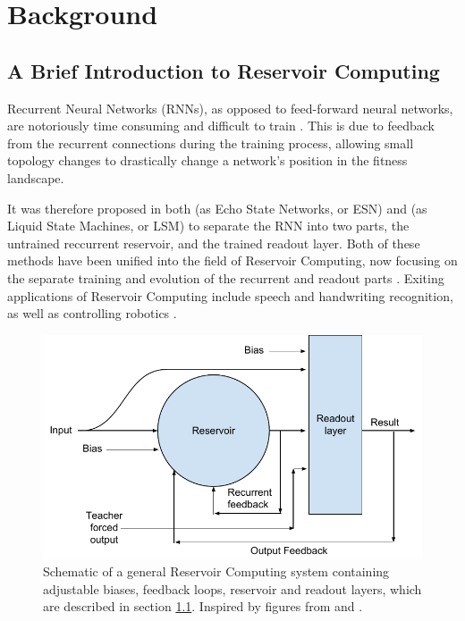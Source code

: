 \chapter{Background}
\label{chapter:background}

\section{A Brief Introduction to Reservoir Computing}
\label{section:reservoir-computing-introduction}

Recurrent Neural Networks (RNNs), as opposed to feed-forward neural networks,
are notoriously time consuming and difficult to train \cite{Schrauwen2007}.
This is due to feedback from the recurrent connections during the training process,
allowing small topology changes to drastically change a network's position in the fitness landscape.

It was therefore proposed in both \cite{jaeger2002adaptive} (as Echo State Networks, or ESN)
and \cite{natschlager2002liquid} (as Liquid State Machines, or LSM) to separate the RNN into two parts,
the untrained reccurrent reservoir, and the trained readout layer.
Both of these methods have been unified into the field of Reservoir Computing,
now focusing on the separate training and evolution of the recurrent and readout parts \cite{lukovsevivcius2012reservoir}.
Exiting applications of Reservoir Computing include speech and handwriting recognition,
as well as controlling robotics \cite{lukovsevivcius2012reservoir}.

\begin{figure}[ht]
    \caption{
        Schematic of a general Reservoir Computing system containing adjustable biases, feedback loops, reservoir and readout layers,
        which are described in section \ref{section:reservoir-computing-introduction}.
        Inspired by figures from \cite{Schrauwen2007} and \cite{Jaeger:2007}.
    }
    \label{fig:rc-schema}
    \includegraphics[width=\columnwidth]{background/reservoir_computing_schema.pdf}
\end{figure}

